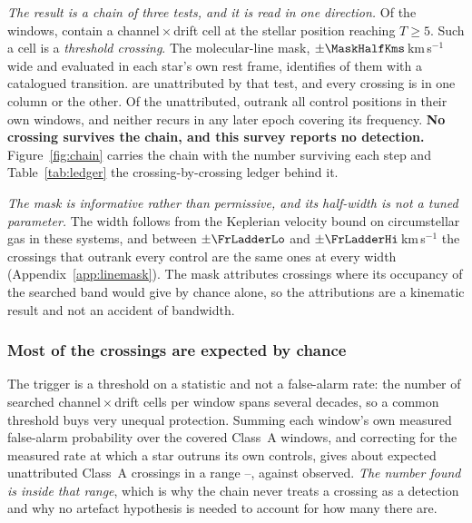 \emph{The result is a chain of three tests, and it is read in one direction.}
Of the \NWindows{} windows, \NCross{} contain a channel\,$\times$\,drift
cell at the stellar position reaching $T\geq5$. Such a cell is a
\emph{threshold crossing}. The molecular-line mask,
$\pm\MaskHalfKms$\,km\,s$^{-1}$ wide and evaluated in each star's own rest
frame, identifies \NAttributed{} of them with a catalogued transition.
\NUnattributed{} are unattributed by that test, and every crossing is in one
column or the other. Of the unattributed, \NUnattrRankFlagged{} outrank
all \NCtrl{} control positions in their own windows, and neither recurs in
any later epoch covering its frequency. \textbf{No crossing survives the
chain, and this survey reports no detection.}
Figure~\ref{fig:chain} carries the chain with the number surviving each
step and Table~\ref{tab:ledger} the crossing-by-crossing ledger behind it.

\emph{The mask is informative rather than permissive, and its half-width is
not a tuned parameter.} The width follows from the Keplerian velocity bound
on circumstellar gas in these systems, and between $\pm\FrLadderLo$ and
$\pm\FrLadderHi$\,km\,s$^{-1}$ the \FrNRankPass{} crossings that outrank
every control are the same ones at every width
(Appendix~\ref{app:linemask}). The
mask attributes \NAttributed{} crossings where its occupancy of the searched
band would give \LgExpAttr{} by chance alone, so the attributions are a
kinematic result and not an accident of bandwidth.

\subsubsection{Most of the crossings are expected by chance}
\label{sec:trigunif}

The trigger is a threshold on a statistic and not a false-alarm
rate: the number of searched channel\,$\times$\,drift cells per window spans
several decades, so a common threshold buys very unequal protection.
Summing each window's own measured false-alarm probability over the covered
Class~A windows, and correcting for the measured rate at which a star outruns
its own controls, gives about \ChnChanceMid{} expected unattributed Class~A
crossings in a range \ChnChanceLo--\ChnChanceHi, against \ChnUnattrA{}
observed. \emph{The number found is inside that range}, which is why the chain
never treats a crossing as a detection and why no artefact hypothesis is
needed to account for how many there are.

